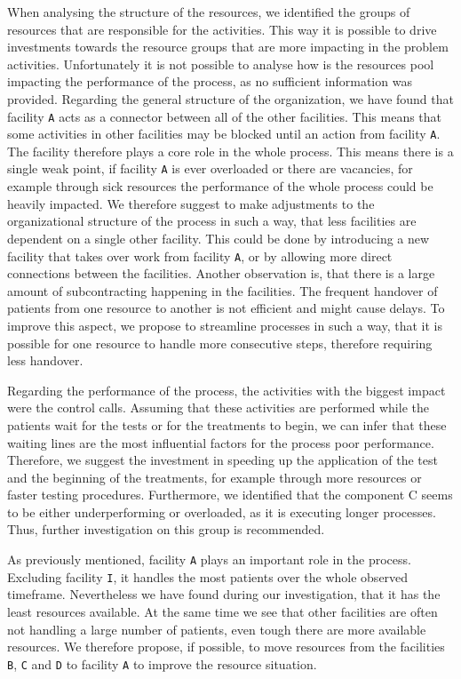 \documentclass[12pt]{report}
\begin{document}
When analysing the structure of the resources, we identified the groups of resources that are responsible for the activities. This way it is possible to drive investments towards the resource groups that are more impacting in the problem activities. Unfortunately it is not possible to analyse how is the resources pool impacting the performance of the process, as no sufficient information was provided. Regarding the general structure of the organization, we have found that facility \texttt{A} acts as a connector between all of the other facilities. This means that some activities in other facilities may be blocked until an action from facility \texttt{A}. The facility therefore plays a core role in the whole process. This means there is a single weak point, if facility \texttt{A} is ever overloaded or there are vacancies, for example through sick resources the performance of the whole process could be heavily impacted. We therefore suggest to make adjustments to the organizational structure of the process in such a way, that less facilities are dependent on a single other facility. This could be done by introducing a new facility that takes over work from facility \texttt{A}, or by allowing more direct connections between the facilities. Another observation is, that there is a large amount of subcontracting happening in the facilities. The frequent handover of patients from one resource to another is not efficient and might cause delays. To improve this aspect, we propose to streamline processes in such a way, that it is possible for one resource to handle more consecutive steps, therefore requiring less handover.

Regarding the performance of the process, the activities with the biggest impact were the control calls. Assuming that these activities are performed while the patients wait for the tests or for the treatments to begin, we can infer that these waiting lines are the most influential factors for the process poor performance. Therefore, we suggest the investment in speeding up the application of the test and the beginning of the treatments, for example through more resources or faster testing procedures. Furthermore, we identified that the component C seems to be either underperforming or overloaded, as it is executing longer processes. Thus, further investigation on this group is recommended.

As previously mentioned, facility \texttt{A} plays an important role in the process. Excluding facility \texttt{I}, it handles the most patients over the whole observed timeframe. Nevertheless we have found during our investigation, that it has the least resources available. At the same time we see that other facilities are often not handling a large number of patients, even tough there are more available resources. We therefore propose, if possible, to move resources from the facilities \texttt{B}, \texttt{C} and \texttt{D} to facility \texttt{A} to improve the resource situation.
\end{document}
